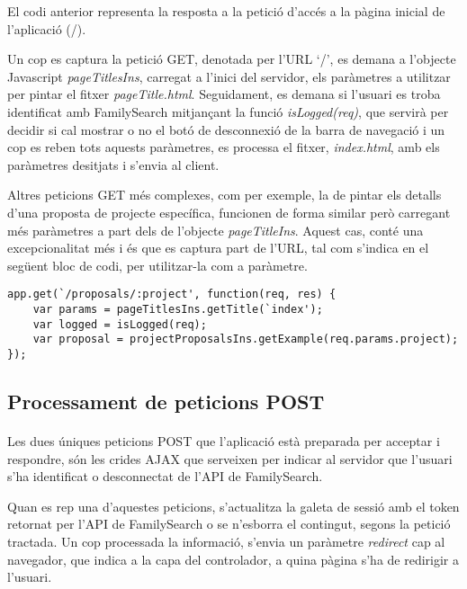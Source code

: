     El codi anterior representa la resposta a la petició d'accés a la pàgina inicial de l'aplicació (/).

    Un cop es captura la petició GET, denotada per l'URL `/',  es demana a l'objecte Javascript \emph{pageTitlesIns}, carregat a l'inici del servidor, els paràmetres a utilitzar per pintar el fitxer \emph{pageTitle.html}. Seguidament, es demana si l’usuari es troba identificat amb FamilySearch mitjançant la funció  \emph{isLogged(req)}, que servirà per decidir si cal mostrar o no el botó de desconnexió de la barra de navegació i un cop es reben tots aquests paràmetres, es processa el fitxer, \emph{index.html}, amb els paràmetres desitjats i s'envia al client.

    Altres peticions GET més complexes, com per exemple, la de pintar els detalls d'una proposta de projecte específica, funcionen de forma similar però carregant més paràmetres a part dels de l'objecte \emph{pageTitleIns}. Aquest cas, conté una excepcionalitat més i és que es captura part de l'URL, tal com s'indica en el següent bloc de codi, per utilitzar-la com a paràmetre.

    \begin{lstlisting}[style=rawOwn,caption={Exemple d'utilització com a paràmetre, d'una part de l'URL}]
app.get(`/proposals/:project', function(req, res) {
    var params = pageTitlesIns.getTitle(`index');
    var logged = isLogged(req);
    var proposal = projectProposalsIns.getExample(req.params.project);
});
    \end{lstlisting}


    \subsection{Processament de peticions POST}

    \paragraph{}
    Les dues úniques peticions POST que l'aplicació està preparada per acceptar i respondre, són les crides AJAX que serveixen per indicar al servidor que l'usuari s'ha identificat o desconnectat de l'API de FamilySearch.

    Quan es rep una d'aquestes peticions, s'actualitza la galeta de sessió amb el token retornat per l'API de FamilySearch o se n'esborra el contingut, segons la petició tractada. Un cop processada la informació, s'envia un paràmetre \emph{redirect} cap al navegador, que indica a la capa del controlador, a quina pàgina s'ha de redirigir a l'usuari.

